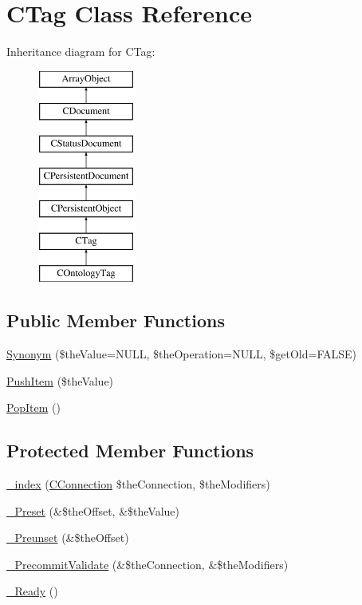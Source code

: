 \hypertarget{class_c_tag}{\section{C\-Tag Class Reference}
\label{class_c_tag}
}
Inheritance diagram for C\-Tag\-:\begin{figure}[H]
\begin{center}
\leavevmode
\includegraphics[height=7.000000cm]{class_c_tag}
\end{center}
\end{figure}
\subsection*{Public Member Functions}
\begin{DoxyCompactItemize}
\item 
\hyperlink{class_c_tag_a5bde38c2605d2559fd8d9c9d85904751}{Synonym} (\$the\-Value=N\-U\-L\-L, \$the\-Operation=N\-U\-L\-L, \$get\-Old=F\-A\-L\-S\-E)
\item 
\hyperlink{class_c_tag_a3ce611f613f6317f450354da2057b90c}{Push\-Item} (\$the\-Value)
\item 
\hyperlink{class_c_tag_a5df518ef6a881d7c2de469fef50ddd92}{Pop\-Item} ()
\end{DoxyCompactItemize}
\subsection*{Protected Member Functions}
\begin{DoxyCompactItemize}
\item 
\hyperlink{class_c_tag_a6797a73041d6d630799998fce617b404}{\-\_\-index} (\hyperlink{class_c_connection}{C\-Connection} \$the\-Connection, \$the\-Modifiers)
\item 
\hyperlink{class_c_tag_a486d3f1d1c789fe14f258ce008d5af5a}{\-\_\-\-Preset} (\&\$the\-Offset, \&\$the\-Value)
\item 
\hyperlink{class_c_tag_a5131b8768fa08bbcecb1c65a046e302c}{\-\_\-\-Preunset} (\&\$the\-Offset)
\item 
\hyperlink{class_c_tag_abc2d1e24a8fc606ff4d6dd018d5af42d}{\-\_\-\-Precommit\-Validate} (\&\$the\-Connection, \&\$the\-Modifiers)
\item 
\hyperlink{class_c_tag_a9fed7b05a04413e04c19a49e592e6242}{\-\_\-\-Ready} ()
\end{DoxyCompactItemize}
